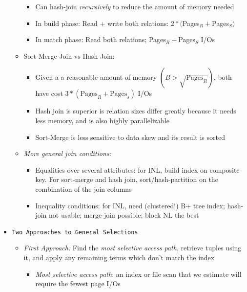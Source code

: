 \documentclass[landscape,8pt]{extarticle}
\newcommand{\code}{\lstinline}
\begin{document}
\begin{multicols}{5}
\begin{itemize}
\begin{itemize}
\begin{itemize}
                            \item Can hash-join \emph{recursively} to reduce the amount of memory needed
                            \item In build phase: Read + write both relations: $2*($Pages$_R + $Pages$_S)$
                            \item In match phase: Read both relations; Pages$_R + $Pages$_S$ I/Os
                        \end{itemize}
                  \item Sort-Merge Join vs Hash Join:
                        \begin{itemize}
                            \item Given a a reasonable amount of memory $(B > \sqrt{\text{Pages}_R})$, both have cost $3*(\text{Pages}_R + \text{Pages}_s)$ I/Os
                            \item Hash join is superior is relation sizes differ greatly because it needs less memory, and is also highly parallelizable
                            \item Sort-Merge is less sensitive to data skew and its result is sorted
                        \end{itemize}
                  \item \emph{More general join conditions:}
                        \begin{itemize}
                            \item Equalities over several attributes: for INL, build index on composite key. For sort-merge and hash join, sort/hash-partition on the combination of the join columns
                            \item Inequality conditions: for INL, need (clustered!) B+ tree index; hash-join not usable; merge-join possible; block NL the best
                        \end{itemize}
              \end{itemize}
        \item \code{Two Approaches to General Selections}
              \begin{itemize}
                  \item \emph{First Approach:} Find the \emph{most selective access path}, retrieve tuples using it, and apply any remaining terms which don't match the index
                        \begin{itemize}
                            \item \emph{Most selective access path}: an index or file scan that we estimate will require the fewest page I/Os

\end{itemize}
\end{itemize}
\end{itemize}
\end{multicols}
\end{document}
